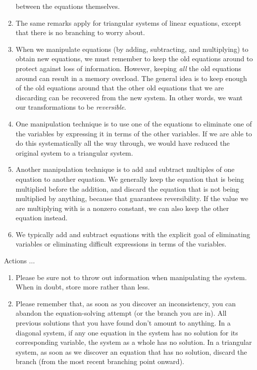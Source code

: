 \documentclass[10pt]{amsart}
\begin{document}
\begin{enumerate}
  between the equations themselves.
\item The same remarks apply for triangular systems of linear
  equations, except that there is no branching to worry about.
\item When we manipulate equations (by adding, subtracting, and
  multiplying) to obtain new equations, we must remember to keep the
  old equations around to protect against loss of
  information. However, keeping {\em all} the old equations around can
  result in a memory overload. The general idea is to keep enough of
  the old equations around that the other old equations that we are
  discarding can be recovered from the new system. In other words, we
  want our transformations to be {\em reversible}.
\item One manipulation technique is to use one of the equations to
  eliminate one of the variables by expressing it in terms of the
  other variables. If we are able to do this systematically all the
  way through, we would have reduced the original system to a
  triangular system.
\item Another manipulation technique is to add and subtract multiples
  of one equation to another equation. We generally keep the equation
  that is being multiplied before the addition, and discard the
  equation that is not being multiplied by anything, because that
  guarantees reversibility. If the value we are multiplying with is a
  nonzero constant, we can also keep the other equation instead.
\item We typically add and subtract equations with the explicit goal
  of eliminating variables or eliminating difficult expressions in
  terms of the variables.
\end{enumerate}

Actions ...

\begin{enumerate}
\item Please be sure not to throw out information when manipulating
  the system. When in doubt, store more rather than less.
\item Please remember that, as soon as you discover an inconsistency,
  you can abandon the equation-solving attempt (or the branch you are
  in). All previous solutions that you have found don't amount to
  anything. In a diagonal system, if any one equation in the system
  has no solution for its corresponding variable, the system as a
  whole has no solution. In a triangular system, as soon as we
  discover an equation that has no solution, discard the branch (from
  the most recent branching point onward).
\end{enumerate}
\end{document}
